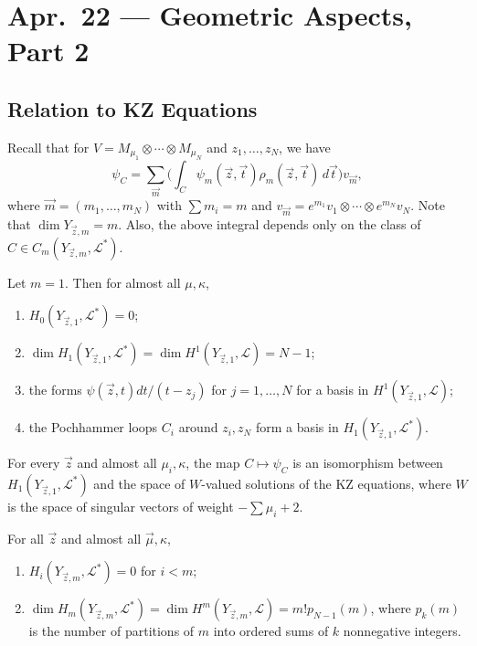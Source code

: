 \chapter{Apr.~22 --- Geometric Aspects, Part 2}

\section{Relation to KZ Equations}

\begin{remark}
  Recall that for
  $V = M_{\mu_1} \otimes \cdots \otimes M_{\mu_N}$
  and $z_1, \dots, z_N$, we have
  \[
    \psi_C
    = \sum_{\vec{m}}
    \bigg(\int_C \psi_m(\vec{z}, \vec{t})
    \rho_m(\vec{z}, \vec{t})\, d\vec{t}\bigg)
    v_{\vec{m}},
  \]
  where $\vec{m} = (m_1, \dots, m_N)$
  with $\sum m_i = m$ and
  $v_{\vec{m}} = e^{m_1} v_1 \otimes \cdots \otimes e^{m_N} v_N$.
  Note that $\dim Y_{\vec{z}, m} = m$.
  Also, the above integral depends only
  on the class of
  $C \in C_m(Y_{\vec{z}, m}, \mathcal{L}^*)$.
\end{remark}

\begin{theorem}[Aomoto]
  Let $m = 1$. Then for almost
  all $\mu, \kappa$,
  \begin{enumerate}
    \item $H_0(Y_{\vec{z}, 1}, \mathcal{L}^*) = 0$;
    \item $\dim H_1(Y_{\vec{z}, 1}, \mathcal{L}^*) = \dim H^1(Y_{\vec{z}, 1}, \mathcal{L}) = N - 1$;
    \item the forms
    $\psi(\vec{z}, t) dt / (t - z_j)$
    for $j = 1, \dots, N$
    for a basis in
    $H^1(Y_{\vec{z}, 1}, \mathcal{L})$;
  \item the Pochhammer
    loops $C_i$
    around $z_i, z_N$ form a basis
    in $H_1(Y_{\vec{z}, 1}, \mathcal{L}^*)$.
  \end{enumerate}
\end{theorem}

\begin{corollary}\label{cor:level-1}
  For every $\vec{z}$ and almost all
  $\mu_i, \kappa$, the
  map $C \mapsto \psi_C$ is an isomorphism
  between $H_1(Y_{\vec{z}, 1}, \mathcal{L}^*)$
  and the space of $W$-valued solutions
  of the KZ equations, where
  $W$ is the space of singular
  vectors of weight $-\sum \mu_i + 2$.
\end{corollary}

\begin{theorem}\label{thm:arbitrary-level}
  For all $\vec{z}$ and
  almost all $\vec{\mu}, \kappa$,
  \begin{enumerate}
    \item $H_i(Y_{\vec{z}, m}, \mathcal{L}^*) = 0$ for $i < m$;
    \item $\dim H_m(Y_{\vec{z}, m}, \mathcal{L}^*) = \dim H^m(Y_{\vec{z}, m}, \mathcal{L}) = m! p_{N - 1}(m)$,
      where $p_k(m)$ is the number of partitions
      of $m$ into ordered sums of
      $k$ nonnegative integers.
  \end{enumerate}
\end{theorem}

